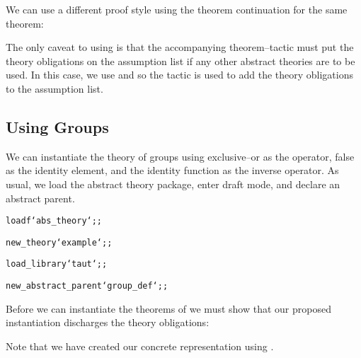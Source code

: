 We can use a different proof style using the theorem continuation
{} for the same theorem:
\begin{boxed}\begin{hol}\begin{alltt}\end{alltt}\end{hol}\end{boxed}
The only caveat to using {} is that the accompanying 
theorem--tactic must put the theory obligations on the assumption list if
any other abstract theories are to be used.  In this case, we use
{} and so the tactic {} is used to add the theory obligations to the assumption list.

\subsection{Using Groups}
We can instantiate the theory of groups using exclusive--or as the
operator, false as the identity element, and the identity function as the
inverse operator.  As usual, we load the abstract theory package, enter
draft mode, and declare  an abstract parent.
\begin{boxed}\begin{hol}\begin{alltt}
loadf `abs_theory`;;

new_theory `example`;;

load_library `taut`;;

new_abstract_parent `group_def`;;
\end{alltt}\end{hol}\end{boxed}

Before we can instantiate the theorems of  we must show that
our proposed instantiation discharges the theory obligations:
\begin{boxed}\begin{hol}\begin{alltt}\end{alltt}\end{hol}\end{boxed}
Note that we have created our concrete representation using 
{}.  


